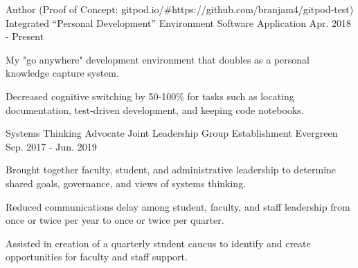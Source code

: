 

\begin{cventries}

  \cventry
    {Author (Proof of Concept: gitpod.io/\#https://github.com/branjam4/gitpod-test)} %
    {Integrated “Personal Development” Environment} %
    {Software Application} %
    {Apr. 2018 - Present} %
    {
      \begin{cvitems} %
        \item {My "go anywhere" development environment that doubles as a personal knowledge capture system.}
        \item {Decreased cognitive switching by 50-100\% for tasks such as locating documentation, test-driven development, and keeping code notebooks.}
        \item {}
      \end{cvitems}
    }
        
%
  \cventry
    {Systems Thinking Advocate} %
    {Joint Leadership Group Establishment} %
    {Evergreen} %
    {Sep. 2017 - Jun. 2019} %
    {
      \begin{cvitems} %
        \item {Brought together faculty, student, and administrative leadership to determine shared goals, governance, and views of systems thinking.}
        \item {Reduced communications delay among student, faculty, and staff leadership from once or twice per year to once or twice per quarter.}
        \item {Assisted in creation of a quarterly student caucus to identify and create opportunities for faculty and staff support.}
      \end{cvitems}
    }


\end{cventries}
